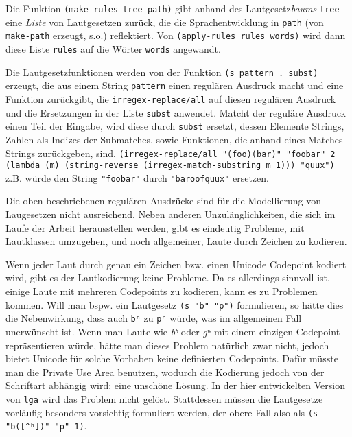 \documentclass[12pt,a4paper,normalheadings]{scrartcl}
\def\bel#1{\textit{#1}}
\def\tt#1{\texttt{#1}}
\begin{document}
Die Funktion \tt{(make-rules tree path)}
gibt anhand des Lautgesetz\emph{baums} \tt{tree} eine \emph{Liste}
von Lautgesetzen zurück,
die die Sprachentwicklung in \tt{path} (von \tt{make-path} erzeugt, s.o.)
reflektiert.
Von \tt{(apply-rules rules words)} wird dann diese Liste \tt{rules}
auf die Wörter \tt{words} angewandt.

Die Lautgesetzfunktionen werden von der Funktion \tt{(s pattern . subst)}
erzeugt,
die aus einem String \tt{pattern} einen regulären Ausdruck macht
und eine Funktion zurückgibt,
die \tt{irregex-replace/all} auf diesen regulären Ausdruck
und die Ersetzungen in der Liste \tt{subst} anwendet.
Matcht der reguläre Ausdruck einen Teil der Eingabe,
wird diese durch \tt{subst} ersetzt,
dessen Elemente Strings, Zahlen als Indizes der Submatches, sowie
Funktionen, die anhand eines Matches Strings zurückgeben, sind.
\tt{(irregex-replace/all "(foo)(bar)" "foobar" 2 (lambda (m)
    (string-reverse (irregex-match-substring m 1))) "quux")}
z.B. würde den String \tt{"foobar"} durch \tt{"baroofquux"} ersetzen.

Die oben beschriebenen regulären Ausdrücke
sind für die Modellierung von Laugesetzen nicht ausreichend.
Neben anderen Unzulänglichkeiten,
die sich im Laufe der Arbeit herausstellen werden,
gibt es eindeutig Probleme, mit Lautklassen umzugehen,
und noch allgemeiner, Laute durch Zeichen zu kodieren.

Wenn jeder Laut durch genau ein Zeichen bzw. einen Unicode Codepoint kodiert wird,
gibt es der Lautkodierung keine Probleme.
Da es allerdings sinnvoll ist,
einige Laute mit mehreren Codepoints zu kodieren,
kann es zu Problemen kommen.
Will man bspw. ein Lautgesetz \tt{(s "b" "p")} formulieren,
so hätte dies die Nebenwirkung,
dass auch \tt{bʰ} zu \tt{pʰ} würde,
was im allgemeinen Fall unerwünscht ist.
Wenn man Laute wie \bel{bʰ} oder \bel{gʷ} mit einem einzigen Codepoint
repräsentieren würde,
hätte man dieses Problem natürlich zwar nicht,
jedoch bietet Unicode für solche Vorhaben keine definierten Codepoints.
Dafür müsste man die Private Use Area benutzen,
wodurch die Kodierung jedoch von der Schriftart abhängig wird:
eine unschöne Lösung.
In der hier entwickelten Version von \tt{lga} wird das Problem nicht gelöst.
Stattdessen müssen die Lautgesetze vorläufig
besonders vorsichtig formuliert werden,
der obere Fall also als \tt{(s "b([\textasciicircum{}ʰ])" "p" 1)}.
\end{document}
